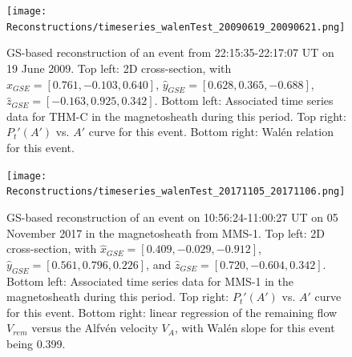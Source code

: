 \begin{figure}
    \centering
    \texttt{[image: Reconstructions/timeseries\_walenTest\_20090619\_20090621.png]} %
    \caption[GS event reconstructions]{GS-based reconstruction of an event from 22:15:35-22:17:07 UT on 19 June 2009. Top left: 2D cross-section, with $\hat{x}_{GSE}=[0.761, -0.103, 0.640]$, $\hat{y}_{GSE}=[0.628, 0.365, -0.688]$, $\hat{z}_{GSE}=[-0.163,0.925,0.342]$. Bottom left: Associated time series data for THM-C in the magnetosheath during this period. Top right: $P_t'(A')$ vs. $A'$ curve for this event. Bottom right: Wal\'en relation for this event.}
    \label{fig:reconstruction-June2009}
\end{figure}





\begin{figure}
    \centering
    \texttt{[image: Reconstructions/timeseries\_walenTest\_20171105\_20171106.png]}
    \caption[GS event reconstructions]{GS-based reconstruction of an event on 10:56:24-11:00:27 UT on 05 November 2017 in the magnetosheath from MMS-1. Top left: 2D cross-section, with $\hat{x}_{GSE}=[0.409, -0.029, -0.912]$, $\hat{y}_{GSE}=[0.561, 0.796, 0.226]$, and $\hat{z}_{GSE}=[0.720, -0.604, 0.342]$. Bottom left: Associated time series data for MMS-1 in the magnetosheath during this period. Top right: $P_t'(A')$ vs. $A'$ curve for this event. Bottom right: linear regression of the remaining flow $V_{rem}$ versus the Alfv\'en velocity $V_A$, with Wal\'en slope for this event being 0.399.}
    \label{fig:reconstruction-quasistatic}
\end{figure}


